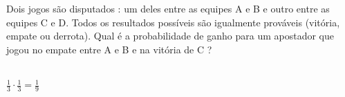 \begin{ex}
Dois jogos são disputados : um deles entre as equipes A e B e outro entre as equipes C e D. Todos os resultados possíveis são igualmente prováveis (vitória, empate ou derrota). Qual é a probabilidade de ganho para um apostador que jogou no empate entre A e B e na vitória de C ?
  \begin{sol}
    \phantom{A} \\
    $\frac{1}{3}\cdot\frac{1}{3}=\frac{1}{9}$
  \end{sol}
\end{ex}